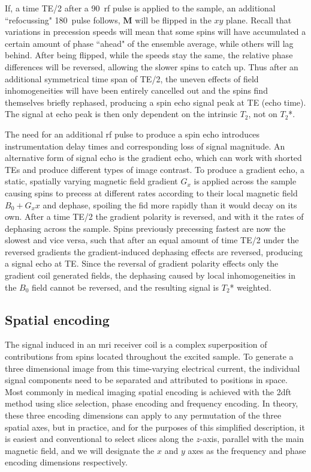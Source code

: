 If, a time TE/2 after a 90\textdegree\ \gls{rf} pulse is applied to the sample, an additional ``refocussing" 180\textdegree\ pulse follows, $\textbf{M}$ will be flipped in the $xy$ plane.
Recall that variations in precession speeds will mean that some spins will have accumulated a certain amount of phase ``ahead" of the ensemble average, while others will lag behind.
After being flipped, while the speeds stay the same, the relative phase differences will be reversed, allowing the slower spins to catch up.
Thus after an additional symmetrical time span of TE/2, the uneven effects of field inhomogeneities will have been entirely cancelled out and the spins find themselves briefly rephased, producing a spin echo signal peak at TE (echo time).
The signal at echo peak is then only dependent on the intrinsic $T_2$, not on $T_2$*.

The need for an additional \gls{rf} pulse to produce a spin echo introduces instrumentation delay times and corresponding loss of signal magnitude.
An alternative form of signal echo is the gradient echo, which can work with shorted TEs and produce different types of image contrast.
To produce a gradient echo, a static, spatially varying magnetic field gradient $G_x$ is applied across the sample causing spins to precess at different rates according to their local magnetic field $B_0 + G_xx$ and dephase, spoiling the \gls{fid} more rapidly than it would decay on its own.
After a time TE/2 the gradient polarity is reversed, and with it the rates of dephasing across the sample.
Spins previously precessing fastest are now the slowest and vice versa, such that after an equal amount of time TE/2 under the reversed gradients the gradient-induced dephasing effects are reversed, producing a signal echo at TE.
Since the reversal of gradient polarity effects only the gradient coil generated fields, the dephasing caused by local inhomogeneities in the $B_0$ field cannot be reversed, and the resulting signal is $T_2$* weighted.

\subsection{Spatial encoding}

The signal induced in an \gls{mri} receiver coil is a complex superposition of contributions from spins located throughout the excited sample.
To generate a three dimensional image from this time-varying electrical current, the individual signal components need to be separated and attributed to positions in space.
Most commonly in medical imaging spatial encoding is achieved with the \gls{2dft} method using slice selection, phase encoding and frequency encoding.\autocite{Hendee2002}
In theory, these three encoding dimensions can apply to any permutation of the three spatial axes, but in practice, and for the purposes of this simplified description, it is easiest and conventional to select slices along the $z$-axis, parallel with the main magnetic field, and we will designate the $x$ and $y$ axes as the frequency and phase encoding dimensions respectively.

